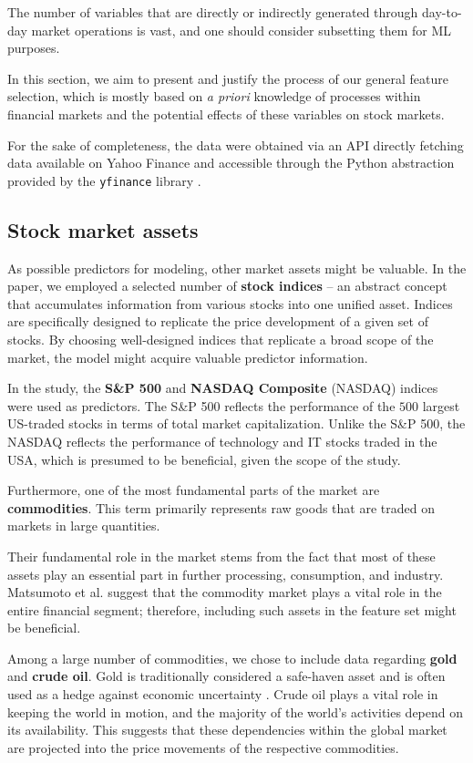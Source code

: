 \documentclass{svk_en}
\begin{document}
The number of variables that are directly or indirectly generated through day-to-day market operations is vast, and one should consider subsetting them for
ML purposes. 

In this section, we aim to present and justify the
process of our general feature selection, which is mostly based on \textit{a priori} knowledge of processes
within financial markets and the potential effects of these variables on stock markets.

For the sake of completeness, the data were obtained via an API directly fetching
data available on Yahoo Finance and accessible through the Python abstraction
provided by the \texttt{yfinance} library \cite{yahoo, yfinance}.

\subsection{Stock market assets}
As possible predictors for modeling, other market assets might be valuable. In the paper, we employed
a selected number of \textbf{stock indices} – an abstract concept that accumulates information from various stocks
into one unified asset. Indices are specifically designed to replicate the price development of a given set of stocks. By choosing
well-designed indices that replicate a broad scope of the market, the model might acquire valuable predictor information.

In the study, the \textbf{S\&P 500} and \textbf{NASDAQ Composite} (NASDAQ) indices were used as predictors. The S\&P 500 reflects the performance
of the $500$ largest US-traded stocks in terms of total market capitalization. Unlike the S\&P 500, the NASDAQ reflects the performance of technology 
and IT stocks traded in the USA, which is presumed to be beneficial, given the scope of the study.   

Furthermore, one of the most fundamental parts of the market are \textbf{commodities}. This term primarily represents raw goods that are traded
on markets in large quantities.

Their fundamental role in the market stems from the fact that most of these assets play an essential part in further processing,
consumption, and industry. Matsumoto et al. \cite{clanok3} suggest that the commodity market
plays a vital role in the entire financial segment; therefore, including such
assets in the feature set might be beneficial.

Among a large number of commodities, we chose to include data regarding \textbf{gold} and \textbf{crude oil}. 
Gold is traditionally considered a safe-haven asset and is often used as a hedge against economic uncertainty \cite{gold}. 
Crude oil plays a vital role in keeping the world in motion, and the majority of the
world’s activities depend on its availability. This suggests that these
dependencies within the global market are projected into the price movements of the
respective commodities.
\end{document}
